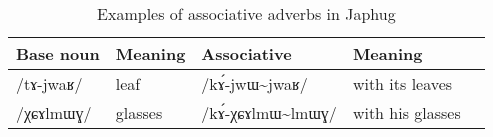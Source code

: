 \documentclass[oneside,a4paper,11pt]{article}
\newcommand{\ipa}[1]{\mbox{\phon/#1/}}
\newcommand{\tld}{\textasciitilde{}}
\begin{document}
\begin{table}
 \caption{Examples of associative adverbs in Japhug} \label{tab:assoc.adv}  \centering
\begin{tabular}{lllll}
\toprule
Base noun & Meaning & Associative & Meaning \\
\midrule
\ipa{tɤ-jwaʁ} & leaf & \ipa{kɤ́-jwɯ\tld{}jwaʁ} & with its leaves\\
\ipa{χɕɤlmɯɣ} & glasses & \ipa{kɤ́-χɕɤlmɯ\tld{}lmɯɣ} & with his glasses\\
\bottomrule
\end{tabular}
\end{table}
    
    



\end{document}

